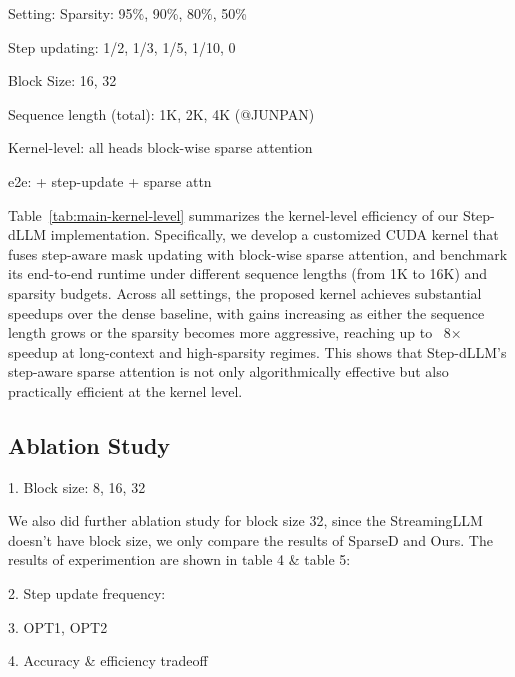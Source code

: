 Setting:
Sparsity: 95\%, 90\%, 80\%, 50\%

Step updating: 1/2, 1/3, 1/5, 1/10, 0

Block Size: 16, 32



%




Sequence length (total): 1K, 2K, 4K (@JUNPAN)

Kernel-level: all heads block-wise sparse attention

e2e: + step-update + sparse attn

Table~\ref{tab:main-kernel-level} summarizes the kernel-level efficiency of our Step-dLLM implementation. Specifically, we develop a customized CUDA kernel that fuses step-aware mask updating with block-wise sparse attention, and benchmark its end-to-end runtime under different sequence lengths (from 1K to 16K) and sparsity budgets. Across all settings, the proposed kernel achieves substantial speedups over the dense baseline, with gains increasing as either the sequence length grows or the sparsity becomes more aggressive, reaching up to ~8× speedup at long-context and high-sparsity regimes. This shows that Step-dLLM’s step-aware sparse attention is not only algorithmically effective but also practically efficient at the kernel level.



\subsection{Ablation Study}

1. Block size: 8, 16, 32

We also did further ablation study for block size 32, since the StreamingLLM doesn't have block size, we only compare the results of SparseD and Ours. The results of experimention are shown in table 4 & table 5:

%
%

2. Step update frequency: 

3. OPT1, OPT2

4. Accuracy \& efficiency tradeoff